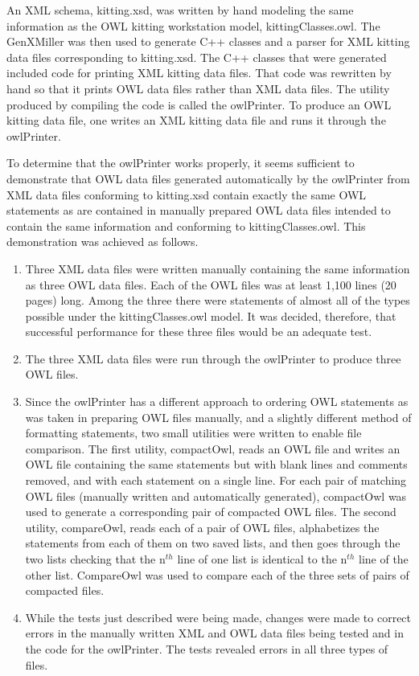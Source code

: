 An XML schema, kitting.xsd, was written by hand modeling the same
information as the OWL kitting workstation model, kittingClasses.owl. The
GenXMiller was then used to generate C++ classes and a parser for XML
kitting data files corresponding to kitting.xsd. The C++ classes that were
generated included code for printing XML kitting data
files. That code was rewritten by hand so that it prints OWL data files
rather than XML data files. The utility produced by compiling the code is
called the owlPrinter. To produce an OWL kitting data file, one writes an
XML kitting data file and runs it through the owlPrinter.

To determine that the owlPrinter works properly, it seems sufficient to
demonstrate that OWL data files generated automatically by the owlPrinter
from XML data files conforming to kitting.xsd contain exactly the same OWL
statements as are contained in manually prepared OWL data files intended to
contain the same information and conforming to kittingClasses.owl. This
demonstration was achieved as follows.

\begin{enumerate}[ (i) ]
\item Three XML data files were written manually containing the same
  information as three OWL data files. Each of the OWL files was at least
  1,100 lines (20 pages) long. Among the three there were statements of
  almost all of the types possible under the kittingClasses.owl model. It was
  decided, therefore, that successful performance for these three files
  would be an adequate test.
\item The three XML data files were run through the owlPrinter to produce
  three OWL files.
\item Since the owlPrinter has a different approach to ordering OWL
  statements as was taken in preparing OWL files manually, and a slightly
  different method of formatting statements, two small utilities were
  written to enable file comparison. The first utility, compactOwl, reads
  an OWL file and writes an OWL file containing the same statements but
  with blank lines and comments removed, and with each statement on a
  single line. For each pair of matching OWL files (manually written and
  automatically generated), compactOwl was used to generate a corresponding
  pair of compacted OWL files. The second utility, compareOwl, reads each
  of a pair of OWL files, alphabetizes the statements from each of them on
  two saved lists, and then goes through the two lists checking that the
  n$^{th}$ line of one list is identical to the n$^{th}$ line of the other list.
  CompareOwl was used to compare each of the three sets of pairs of
  compacted files.
\item While the tests just described were being made, changes were made to
  correct errors in the manually written XML and OWL data files being
  tested and in the code for the owlPrinter. The tests revealed errors in
  all three types of files.
\end{enumerate}

